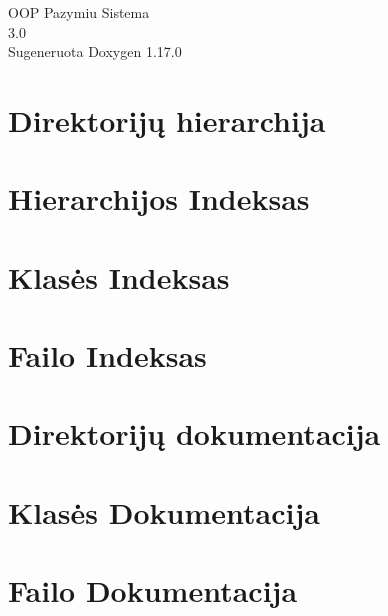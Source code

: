 \documentclass[twoside]{book}
\newcommand{\+}{\discretionary{\mbox{\scriptsize$\hookleftarrow$}}{}{}}
\newcommand{\clearemptydoublepage}{%
    \newpage{\pagestyle{empty}\cleardoublepage}%
  }
\begin{document}
  \raggedbottom
    \hypersetup{pageanchor=false,
                bookmarksnumbered=true,
                pdfencoding=unicode
               }
  \begin{titlepage}
  \vspace*{7cm}
  \begin{center}%
  {\Large OOP Pazymiu Sistema}\\
  [1ex]\large 3.\+0 \\
  \vspace*{1cm}
  {\large Sugeneruota Doxygen 1.17.0}\\
  \end{center}
  \end{titlepage}
  \clearemptydoublepage
  \tableofcontents
  \clearemptydoublepage
  \hypersetup{pageanchor=true}

\chapter{Direktorijų hierarchija}

\chapter{Hierarchijos Indeksas}

\chapter{Klasės Indeksas}

\chapter{Failo Indeksas}

\chapter{Direktorijų dokumentacija}

\chapter{Klasės Dokumentacija}



\chapter{Failo Dokumentacija}











  \backmatter
  \newpage
  \clearemptydoublepage
  \printindex
\end{document}
